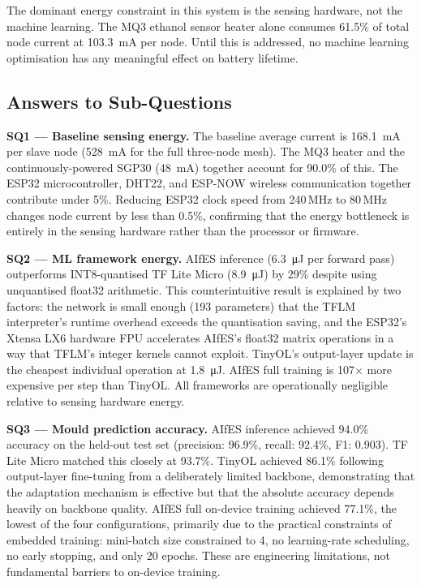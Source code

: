 The dominant energy constraint in this system is the sensing hardware, not the machine learning. The MQ3 ethanol sensor heater alone consumes 61.5\% of total node current at \SI{103.3}{\milli\ampere} per node. Until this is addressed, no machine learning optimisation has any meaningful effect on battery lifetime.

\subsection{Answers to Sub-Questions}

\textbf{SQ1 --- Baseline sensing energy.} The baseline average current is \SI{168.1}{\milli\ampere} per slave node (\SI{528}{\milli\ampere} for the full three-node mesh). The MQ3 heater and the continuously-powered SGP30 (\SI{48}{\milli\ampere}) together account for 90.0\% of this. The ESP32 microcontroller, DHT22, and ESP-NOW wireless communication together contribute under 5\%. Reducing ESP32 clock speed from 240\,MHz to 80\,MHz changes node current by less than 0.5\%, confirming that the energy bottleneck is entirely in the sensing hardware rather than the processor or firmware.

\textbf{SQ2 --- ML framework energy.} AIfES inference (\SI{6.3}{\micro\joule} per forward pass) outperforms INT8-quantised TF Lite Micro (\SI{8.9}{\micro\joule}) by 29\% despite using unquantised float32 arithmetic. This counterintuitive result is explained by two factors: the network is small enough (193 parameters) that the TFLM interpreter's runtime overhead exceeds the quantisation saving, and the ESP32's Xtensa LX6 hardware FPU accelerates AIfES's float32 matrix operations in a way that TFLM's integer kernels cannot exploit. TinyOL's output-layer update is the cheapest individual operation at \SI{1.8}{\micro\joule}. AIfES full training is 107$\times$ more expensive per step than TinyOL. All frameworks are operationally negligible relative to sensing hardware energy.

\textbf{SQ3 --- Mould prediction accuracy.} AIfES inference achieved 94.0\% accuracy on the held-out test set (precision: 96.9\%, recall: 92.4\%, F1: 0.903). TF Lite Micro matched this closely at 93.7\%. TinyOL achieved 86.1\% following output-layer fine-tuning from a deliberately limited backbone, demonstrating that the adaptation mechanism is effective but that the absolute accuracy depends heavily on backbone quality. AIfES full on-device training achieved 77.1\%, the lowest of the four configurations, primarily due to the practical constraints of embedded training: mini-batch size constrained to 4, no learning-rate scheduling, no early stopping, and only 20 epochs. These are engineering limitations, not fundamental barriers to on-device training.

